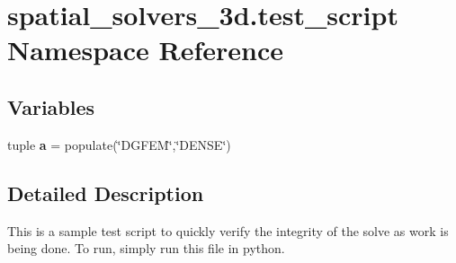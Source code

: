 \hypertarget{namespacespatial__solvers__3d_1_1test__script}{\section{spatial\+\_\+solvers\+\_\+3d.\+test\+\_\+script Namespace Reference}
\label{namespacespatial__solvers__3d_1_1test__script}
}
\subsection*{Variables}
\begin{DoxyCompactItemize}
\item 
\hypertarget{namespacespatial__solvers__3d_1_1test__script_a4ebe6e153000a7d29becae719c6c6189}{tuple {\bfseries a} = populate(\char`\"{}D\+G\+F\+E\+M\char`\"{},\char`\"{}D\+E\+N\+S\+E\char`\"{})}\label{namespacespatial__solvers__3d_1_1test__script_a4ebe6e153000a7d29becae719c6c6189}

\end{DoxyCompactItemize}


\subsection{Detailed Description}
\begin{DoxyVerb}This is a sample test script to quickly verify the integrity of the solve as work is being done.  To run, 
simply run this file in python. \end{DoxyVerb}
 